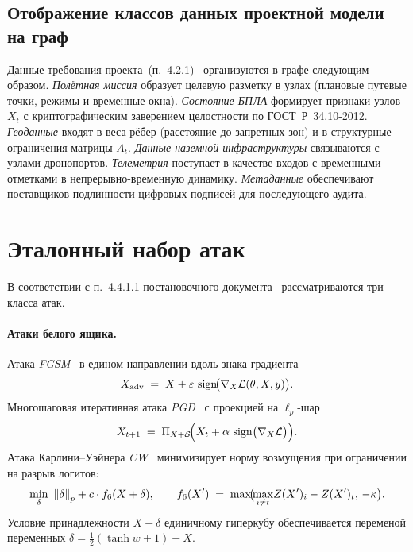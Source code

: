 \subsection{Отображение классов данных проектной модели на граф}
Данные требования проекта~(п.~4.2.1)~\cite{uav_proposal_2026}
организуются в графе следующим образом. \emph{Полётная миссия} образует
целевую разметку в узлах (плановые путевые точки, режимы и временные
окна). \emph{Состояние БПЛА} формирует признаки узлов $X_t$ с
криптографическим заверением целостности по \mbox{ГОСТ~Р~34.10-2012}.
\emph{Геоданные} входят в веса рёбер (расстояние до запретных зон) и в
структурные ограничения матрицы $A_t$. \emph{Данные наземной
инфраструктуры} связываются с узлами дронопортов. \emph{Телеметрия}
поступает в качестве входов с временными отметками в
непрерывно-временную динамику. \emph{Метаданные} обеспечивают
поставщиков подлинности цифровых подписей для последующего аудита.

\section{Эталонный набор атак}
\label{sec:uav_threat}

В соответствии с п.~4.4.1.1 постановочного
документа~\cite{uav_proposal_2026} рассматриваются три класса атак.

\paragraph{Атаки белого ящика.}
Атака \emph{FGSM}~\cite{goodfellow_fgsm} в едином направлении вдоль
знака градиента
\begin{equation}
X_{\text{adv}} \;=\; X + \varepsilon\,\operatorname{sign}\!\bigl(\nabla_{X}\mathcal{L}(\theta,X,y)\bigr).
\label{eq:uav_fgsm}
\end{equation}
Многошаговая итеративная атака \emph{PGD}~\cite{madry_pgd} с проекцией
на $\ell_p$-шар
\begin{equation}
X_{t+1} \;=\; \Pi_{X+\mathcal{S}}\!\Bigl(X_t + \alpha\,\operatorname{sign}\bigl(\nabla_X\mathcal{L}\bigr)\Bigr).
\label{eq:uav_pgd}
\end{equation}
Атака Карлини--Уэйнера \emph{CW}~\cite{carlini_cw} минимизирует норму
возмущения при ограничении на разрыв логитов:
\begin{equation}
\min_{\delta}\ \left\lVert\delta\right\rVert_p + c\cdot f_{6}(X+\delta),\qquad
f_{6}(X') \;=\; \max\!\bigl(\!\max_{i\neq t}\!Z(X')_i - Z(X')_t,\,-\kappa\bigr).
\label{eq:uav_cw}
\end{equation}
Условие принадлежности $X+\delta$ единичному гиперкубу обеспечивается
переменой переменных $\delta = \tfrac{1}{2}(\tanh w + 1) - X$.

